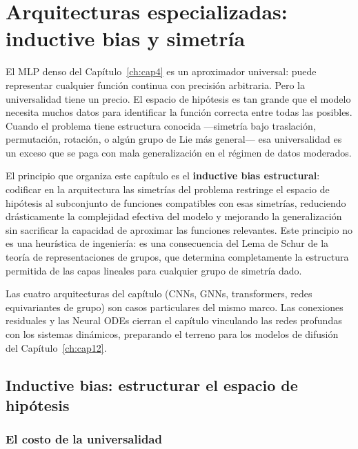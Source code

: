 \chapter{Arquitecturas especializadas: inductive bias y simetría}
\label{ch:cap9}

El MLP denso del Capítulo~\ref{ch:cap4} es un aproximador universal: puede representar
cualquier función continua con precisión arbitraria. Pero la universalidad tiene
un precio. El espacio de hipótesis es tan grande que el modelo necesita muchos
datos para identificar la función correcta entre todas las posibles. Cuando el
problema tiene estructura conocida —simetría bajo traslación, permutación,
rotación, o algún grupo de Lie más general— esa universalidad es un exceso que
se paga con mala generalización en el régimen de datos moderados.

El principio que organiza este capítulo es el \textbf{inductive bias estructural}:
codificar en la arquitectura las simetrías del problema restringe el espacio de
hipótesis al subconjunto de funciones compatibles con esas simetrías, reduciendo
drásticamente la complejidad efectiva del modelo y mejorando la generalización
sin sacrificar la capacidad de aproximar las funciones relevantes. Este principio
no es una heurística de ingeniería: es una consecuencia del Lema de Schur de la
teoría de representaciones de grupos, que determina completamente la estructura
permitida de las capas lineales para cualquier grupo de simetría dado.

Las cuatro arquitecturas del capítulo (CNNs, GNNs, transformers, redes
equivariantes de grupo) son casos particulares del mismo marco. Las conexiones
residuales y las Neural ODEs cierran el capítulo vinculando las redes profundas
con los sistemas dinámicos, preparando el terreno para los modelos de difusión
del Capítulo~\ref{ch:cap12}.

\section{Inductive bias: estructurar el espacio de hipótesis}
\label{sec:inductive_bias}

\subsection{El costo de la universalidad}
\label{subsec:costo_universalidad}

